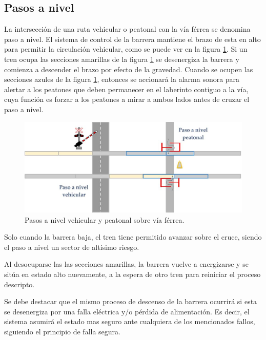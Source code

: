 		\subsection{Pasos a nivel}
		
			La intersección de una ruta vehicular o peatonal con la vía férrea se denomina paso a nivel. El sistema de control de la barrera mantiene el brazo de esta en alto para permitir la circulación vehicular, como se puede ver en la figura \ref{fig:Paso_a_nivel}. Si un tren ocupa las secciones amarillas de la figura \ref{fig:Paso_a_nivel} se desenergiza la barrera y comienza a descender el brazo por efecto de la gravedad. Cuando se ocupen las secciones azules de la figura \ref{fig:Paso_a_nivel}, entonces se accionará la alarma sonora para alertar a los peatones que deben permanecer en el laberinto contiguo a la vía, cuya función es forzar a los peatones a mirar a ambos lados antes de cruzar el paso a nivel.			
			
			\begin{figure}[h!]
				\centering
				\includegraphics[scale=0.4]{./Figures/Paso a nivel}
				\caption{Pasos a nivel vehicular y peatonal sobre vía férrea.}
				\label{fig:Paso_a_nivel}
			\end{figure}
			
			Solo cuando la barrera baja, el tren tiene permitido avanzar sobre el cruce, siendo el paso a nivel un sector de altísimo riesgo.
			
			Al desocuparse las las secciones amarillas, la barrera vuelve a energizarse y se sitúa en estado alto nuevamente, a la espera de otro tren para reiniciar el proceso descripto.
						
			Se debe destacar que el mismo proceso de descenso de la barrera ocurrirá si esta se desenergiza por una falla eléctrica y/o pérdida de alimentación. Es decir, el sistema asumirá el estado mas seguro ante cualquiera de los mencionados fallos, siguiendo el principio de falla segura.
		
